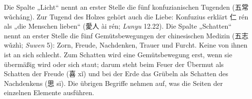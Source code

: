 \documentclass[12pt,paper=a5,DIV=13,headings=small,twoside=true,open=any]{scrbook}
\newlength{\normalparindent}
\newenvironment{einleitung}
  {\par\justifying\setlength{\parindent}{\normalparindent}\setlength{\parskip}{0pt}}
  {\par}
\newcommand{\linkeseite}{\clearpage\ifodd\value{page}\hbox{}\thispagestyle{empty}\clearpage\fi}
\begin{document}
\begin{einleitung}
{\small Die Spalte „Licht“ nennt an erster Stelle die fünf konfuzianischen Tugenden ({\cjk 五常} wǔcháng). Zur Tugend des Holzes gehört auch die Liebe: Konfuzius erklärt {\cjk 仁} rén als „die Menschen lieben“ ({\cjk 愛人} ài rén; \textit{Lunyu} 12.22). Die Spalte „Schatten“ nennt an erster Stelle die fünf Gemütsbewegungen der chinesischen Medizin ({\cjk 五志} wǔzhì; \textit{Suwen} 5): Zorn, Freude, Nachdenken, Trauer und Furcht. Keine von ihnen ist an sich schlecht. Zum Schatten wird eine Gemütsbewegung erst, wenn sie übermäßig wird oder sich staut; darum steht beim Feuer der Übermut als Schatten der Freude ({\cjk 喜} xǐ) und bei der Erde das Grübeln als Schatten des Nachdenkens ({\cjk 思} sī). Die übrigen Begriffe nehmen auf, was die Seiten der einzelnen Elemente ausführen.\par}
\end{einleitung}
\linkeseite
{}
\end{document}
